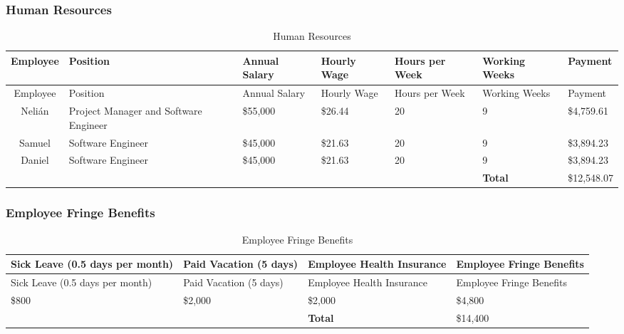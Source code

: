 \subsubsection{Human Resources}
\setlength{\extrarowheight}{1.5pt}
  \begin{longtable}{|c|p{3.5cm}|p{1.5cm}|p{1cm}|p{1cm}|p{1.5cm}|p{2cm}|}
 \caption{Human Resources} \\
   \hline
  
  \centering Employee & Position & Annual Salary & Hourly Wage & Hours per Week & Working Weeks & Payment \\
  \hline \hline \endfirsthead
  
     \hline

	\centering Employee & Position & Annual Salary & Hourly Wage & Hours per Week & Working Weeks & Payment \\
	\hline \hline \endhead
  
  \endfoot  
    Nelián & Project Manager and Software Engineer & \$55,000  & \$26.44  & 20    & 9    & \$4,759.61  \\ \hline
    Samuel & Software Engineer & \$45,000  & \$21.63  & 20    & 9    & \$3,894.23  \\ \hline
    Daniel & Software Engineer & \$45,000  & \$21.63  & 20    & 9    & \$3,894.23  \\ \hline
    \multicolumn{1}{l}{}      & \multicolumn{1}{l}{}      & \multicolumn{1}{l}{}      & \multicolumn{1}{l}{}      & \multicolumn{1}{l}{}      & \multicolumn{1}{l}{\textbf{Total}} & \multicolumn{1}{l}{\$12,548.07}            
\end{longtable}

\subsubsection{Employee Fringe Benefits}
\setlength{\extrarowheight}{1.5pt}
  \begin{longtable}{|p{3cm}|p{3cm}|p{3cm}|p{3cm}|}
 \caption{Employee Fringe Benefits} \\
   \hline
  
  \centering Sick Leave (0.5 days per month) & Paid Vacation (5 days) & Employee Health Insurance & Employee Fringe Benefits \\
  \hline \hline \endfirsthead
  
     \hline

	\centering Sick Leave (0.5 days per month) & Paid Vacation (5 days) & Employee Health Insurance & Employee Fringe Benefits \\
	\hline \hline \endhead
  
  \endfoot  

    \$800 & \$2,000 & \$2,000 & \$4,800  \\ \hline
    \multicolumn{1}{l}{}      & \multicolumn{1}{l}{}      & \multicolumn{1}{l}{\textbf{Total}} & \multicolumn{1}{l}{\$14,400}
\end{longtable}

